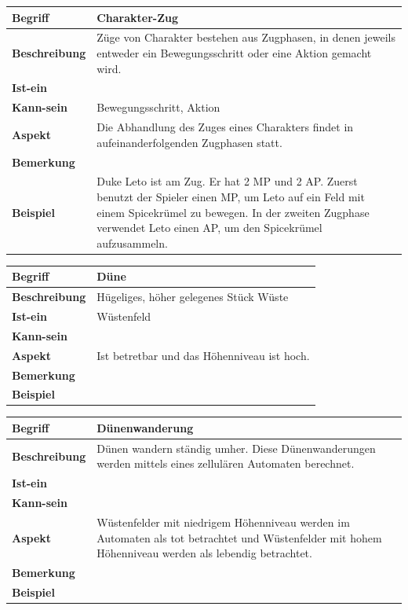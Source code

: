 \documentclass[12pt]{article}
\begin{document}
\begin{tabularx}{16cm}{|l|X|}
\hline
\textbf{Begriff} & \textbf{Charakter-Zug} \\
\hline
\textbf{Beschreibung} & Züge von Charakter bestehen aus Zugphasen, in denen jeweils entweder ein Bewegungsschritt oder eine Aktion gemacht wird.\\
\hline
\textbf{Ist-ein} & \\
\hline
\textbf{Kann-sein} & Bewegungsschritt, Aktion\\
\hline
\textbf{Aspekt} & Die Abhandlung des Zuges eines Charakters findet in aufeinanderfolgenden Zugphasen statt.\\
\hline
\textbf{Bemerkung} &  \\
\hline
\textbf{Beispiel} & Duke Leto ist am Zug. Er hat 2 MP und 2 AP. Zuerst benutzt der Spieler einen MP, um Leto auf ein Feld mit einem Spicekrümel zu bewegen. In der zweiten Zugphase verwendet Leto einen AP, um den Spicekrümel aufzusammeln.\\
\hline
\end{tabularx}

\begin{tabularx}{16cm}{|l|X|}
\hline
\textbf{Begriff} & \textbf{Düne} \\
\hline
\textbf{Beschreibung} & Hügeliges, höher gelegenes Stück Wüste \\
\hline
\textbf{Ist-ein} & Wüstenfeld \\
\hline
\textbf{Kann-sein} & \\
\hline
\textbf{Aspekt} & Ist betretbar und das Höhenniveau ist hoch. \\
\hline
\textbf{Bemerkung} &  \\
\hline
\textbf{Beispiel} &  \\
\hline
\end{tabularx}

\begin{tabularx}{16cm}{|l|X|}
\hline
\textbf{Begriff} & \textbf{Dünenwanderung} \\
\hline
\textbf{Beschreibung} & Dünen wandern ständig umher. Diese Dünenwanderungen werden mittels eines zellulären Automaten berechnet. \\
\hline
\textbf{Ist-ein} & \\
\hline
\textbf{Kann-sein} & \\
\hline
\textbf{Aspekt} & Wüstenfelder mit niedrigem Höhenniveau werden im Automaten als \glqq{}tot\grqq{} betrachtet und Wüstenfelder mit hohem Höhenniveau werden als \glqq{}lebendig\grqq{} betrachtet. \\
\hline
\textbf{Bemerkung} &  \\
\hline
\textbf{Beispiel} &  \\
\hline
\end{tabularx}
\end{document}
